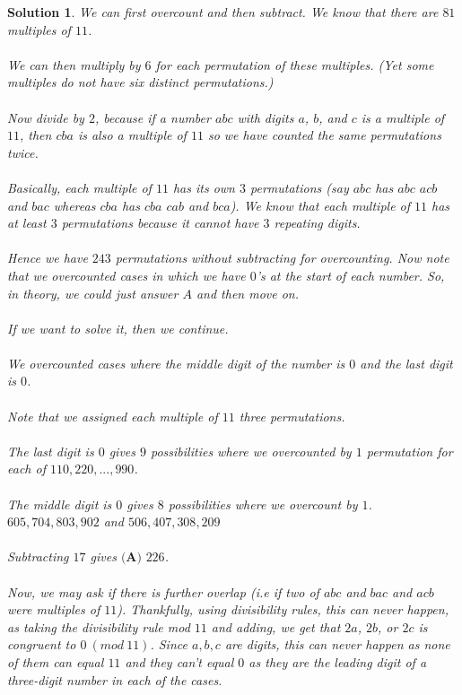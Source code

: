 \documentclass[12pt]{article}
\newtheorem*{solution*}{Solution}
\begin{document}
\begin{solution*}
    We can first overcount and then subtract.
We know that there are $81$ multiples of $11$.
\\ \\
We can then multiply by $6$ for each permutation of these multiples. (Yet some multiples do not have six distinct permutations.)
\\ \\
Now divide by $2$, because if a number $abc$ with digits $a$, $b$, and $c$ is a multiple of $11$, then $cba$ is also a multiple of $11$ so we have counted the same permutations twice. 
\\ \\
Basically, each multiple of $11$ has its own $3$ permutations (say $abc$ has $abc$ $acb$ and $bac$ whereas $cba$ has $cba$ $cab$ and $bca$). We know that each multiple of $11$ has at least $3$ permutations because it cannot have $3$ repeating digits.
\\ \\
Hence we have $243$ permutations without subtracting for overcounting.
Now note that we overcounted cases in which we have $0$'s at the start of each number. So, in theory, we could just answer $A$ and then move on.
\\ \\
If we want to solve it, then we continue.
\\ \\
We overcounted cases where the middle digit of the number is $0$ and the last digit is $0$.
\\ \\
Note that we assigned each multiple of $11$ three permutations.
\\ \\
The last digit is $0$ gives $9$ possibilities where we overcounted by $1$ permutation for each of $110, 220, ... , 990$.
\\ \\
The middle digit is $0$ gives $8$ possibilities where we overcount by $1$.
$605, 704, 803, 902$ and $506, 407, 308, 209$
\\ \\
Subtracting $17$ gives $\boxed{\textbf{(A) } 226}$.
\\ \\
Now, we may ask if there is further overlap (i.e if two of $abc$ and $bac$ and $acb$ were multiples of $11$). Thankfully, using divisibility rules, this can never happen, as taking the divisibility rule mod $11$ and adding, we get that $2a$, $2b$, or $2c$  is congruent to $0\ (mod\ 11)$. Since $a, b, c$ are digits, this can never happen as none of them can equal $11$ and they can't equal $0$ as they are the leading digit of a three-digit number in each of the cases.
\\ \\
\end{solution*}
\end{document}
